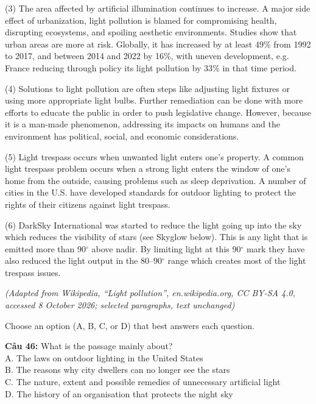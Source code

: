 \documentclass[12pt,a4paper]{article}
\begin{document}
(3) The area affected by artificial illumination continues to increase. A major side effect of urbanization, light pollution is blamed for compromising health, disrupting ecosystems, and spoiling aesthetic environments. Studies show that urban areas are more at risk. Globally, it has increased by at least 49\% from 1992 to 2017, and between 2014 and 2022 by 16\%, with uneven development, e.g. France reducing through policy its light pollution by 33\% in that time period.

(4) Solutions to light pollution are often steps like adjusting light fixtures or using more appropriate light bulbs. Further remediation can be done with more efforts to educate the public in order to push legislative change. However, because it is a man-made phenomenon, addressing its impacts on humans and the environment has political, social, and economic considerations.

(5) Light trespass occurs when unwanted light enters one's property. A common light trespass problem occurs when a strong light enters the window of one's home from the outside, causing problems such as sleep deprivation. A number of cities in the U.S. have developed standards for outdoor lighting to protect the rights of their citizens against light trespass.

(6) DarkSky International was started to reduce the light going up into the sky which reduces the visibility of stars (see Skyglow below). This is any light that is emitted more than 90$^\circ$ above nadir. By limiting light at this 90$^\circ$ mark they have also reduced the light output in the 80--90$^\circ$ range which creates most of the light trespass issues.
\begin{flushright}\small\textit{(Adapted from Wikipedia, ``Light pollution'', en.wikipedia.org, CC BY-SA 4.0, accessed 8 October 2026; selected paragraphs, text unchanged)}\end{flushright}

\par\nobreak


\noindent Choose an option (A, B, C, or D) that best answers each question.%

\noindent \textbf{Câu 46:} What is the passage mainly about?\\
\noindent A. The laws on outdoor lighting in the United States\\
\noindent B. The reasons why city dwellers can no longer see the stars\\
\noindent C. The nature, extent and possible remedies of unnecessary artificial light\\
\noindent D. The history of an organisation that protects the night sky
\end{document}
